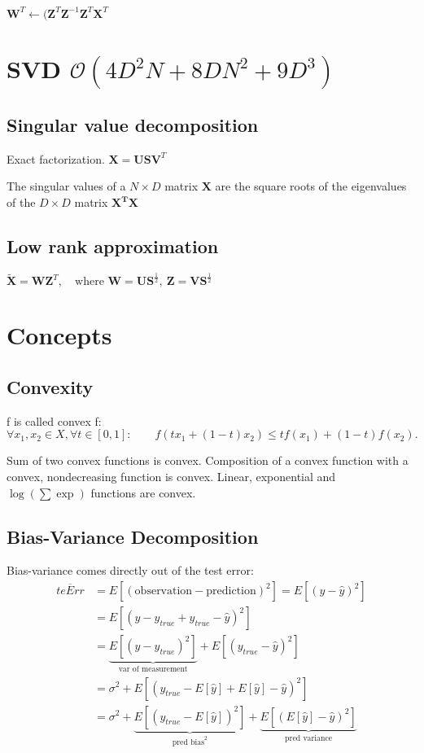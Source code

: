 \documentclass[10pt,a4paper,landscape]{article}
\renewcommand{\bf}[1]{\ensuremath{\mathbf{#1}}}
\begin{document}
\begin{multicols*}{4}
$\bf{W}^T \leftarrow (\bf{Z}^T\bf{Z}^{-1}\bf{Z}^T\bf{X}^T$

\section{SVD \small$\mathcal{O}(4D^2N+8DN^2+9D^3)$}
\subsection{Singular value decomposition}
Exact factorization.
$\bf{X} = \bf{USV}^T$

The singular values of a $N \times D$ matrix $\bf{X}$ are the square roots of the eigenvalues of the $D \times D$ matrix $\bf{X^T X}$

\subsection{Low rank approximation}
$\tilde{\bf{X}} = \bf{WZ}^T, \quad \text{where }\bf{W} = \bf{US}^{\frac{1}{2}},\: \bf{Z}=\bf{VS}^{\frac{1}{2}}$
\section{Concepts}

\subsection{Convexity}
f is called convex f: $\forall x_1, x_2 \in X, \forall t \in [0, 1]: \qquad f(tx_1+(1-t)x_2)\leq t f(x_1)+(1-t)f(x_2).$

Sum of two convex functions is convex. Composition of a convex function with a convex, nondecreasing function is convex. Linear, exponential and $\log(\sum \exp)$ functions are convex.

\subsection{Bias-Variance Decomposition}

Bias-variance comes directly out of the test error:
 \begin{align*}
 \overline{teErr}
 &= E[(\text{observation} - \text{prediction})^2] = E[(y - \hat{y})^2] \\
 &= E[(y - y_{true} + y_{true} - \hat{y})^2] \\
 &=\underbrace{E[(y - y_{true})^2]}_{\text{var of measurement}} + E[(y_{true} - \hat{y})^2] \\
 &=\sigma^2 + E[(y_{true} - E[\hat{y}] + E[\hat{y}] - \hat{y})^2] \\
 &=\sigma^2 + \underbrace{E[(y_{true} - E[\hat{y}])^2]}_{\text{pred bias}^2} +\underbrace{E[(E[\hat{y}] - \hat{y})^2]}_{\text{pred variance}}
\end{align*}


\end{multicols*}
\end{document}

